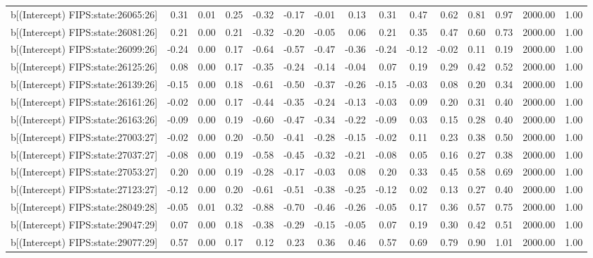 \begin{table}[ht]
\begin{tabular}{rrrrrrrrrrrrrrr}
  b[(Intercept) FIPS:state:26065:26] & 0.31 & 0.01 & 0.25 & -0.32 & -0.17 & -0.01 & 0.13 & 0.31 & 0.47 & 0.62 & 0.81 & 0.97 & 2000.00 & 1.00 \\ 
  b[(Intercept) FIPS:state:26081:26] & 0.21 & 0.00 & 0.21 & -0.32 & -0.20 & -0.05 & 0.06 & 0.21 & 0.35 & 0.47 & 0.60 & 0.73 & 2000.00 & 1.00 \\ 
  b[(Intercept) FIPS:state:26099:26] & -0.24 & 0.00 & 0.17 & -0.64 & -0.57 & -0.47 & -0.36 & -0.24 & -0.12 & -0.02 & 0.11 & 0.19 & 2000.00 & 1.00 \\ 
  b[(Intercept) FIPS:state:26125:26] & 0.08 & 0.00 & 0.17 & -0.35 & -0.24 & -0.14 & -0.04 & 0.07 & 0.19 & 0.29 & 0.42 & 0.52 & 2000.00 & 1.00 \\ 
  b[(Intercept) FIPS:state:26139:26] & -0.15 & 0.00 & 0.18 & -0.61 & -0.50 & -0.37 & -0.26 & -0.15 & -0.03 & 0.08 & 0.20 & 0.34 & 2000.00 & 1.00 \\ 
  b[(Intercept) FIPS:state:26161:26] & -0.02 & 0.00 & 0.17 & -0.44 & -0.35 & -0.24 & -0.13 & -0.03 & 0.09 & 0.20 & 0.31 & 0.40 & 2000.00 & 1.00 \\ 
  b[(Intercept) FIPS:state:26163:26] & -0.09 & 0.00 & 0.19 & -0.60 & -0.47 & -0.34 & -0.22 & -0.09 & 0.03 & 0.15 & 0.28 & 0.40 & 2000.00 & 1.00 \\ 
  b[(Intercept) FIPS:state:27003:27] & -0.02 & 0.00 & 0.20 & -0.50 & -0.41 & -0.28 & -0.15 & -0.02 & 0.11 & 0.23 & 0.38 & 0.50 & 2000.00 & 1.00 \\ 
  b[(Intercept) FIPS:state:27037:27] & -0.08 & 0.00 & 0.19 & -0.58 & -0.45 & -0.32 & -0.21 & -0.08 & 0.05 & 0.16 & 0.27 & 0.38 & 2000.00 & 1.00 \\ 
  b[(Intercept) FIPS:state:27053:27] & 0.20 & 0.00 & 0.19 & -0.28 & -0.17 & -0.03 & 0.08 & 0.20 & 0.33 & 0.45 & 0.58 & 0.69 & 2000.00 & 1.00 \\ 
  b[(Intercept) FIPS:state:27123:27] & -0.12 & 0.00 & 0.20 & -0.61 & -0.51 & -0.38 & -0.25 & -0.12 & 0.02 & 0.13 & 0.27 & 0.40 & 2000.00 & 1.00 \\ 
  b[(Intercept) FIPS:state:28049:28] & -0.05 & 0.01 & 0.32 & -0.88 & -0.70 & -0.46 & -0.26 & -0.05 & 0.17 & 0.36 & 0.57 & 0.75 & 2000.00 & 1.00 \\ 
  b[(Intercept) FIPS:state:29047:29] & 0.07 & 0.00 & 0.18 & -0.38 & -0.29 & -0.15 & -0.05 & 0.07 & 0.19 & 0.30 & 0.42 & 0.51 & 2000.00 & 1.00 \\ 
  b[(Intercept) FIPS:state:29077:29] & 0.57 & 0.00 & 0.17 & 0.12 & 0.23 & 0.36 & 0.46 & 0.57 & 0.69 & 0.79 & 0.90 & 1.01 & 2000.00 & 1.00 \\ 

\end{tabular}
\end{table}
